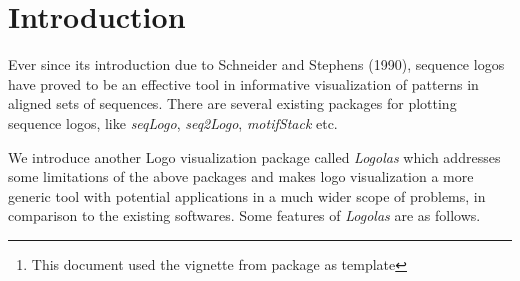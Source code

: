 \documentclass[12pt]{article}\usepackage[]{graphicx}\usepackage[usenames,dvipsnames]{color}
\author{Kushal K Dey, Dongyue Xie, Matthew Stephens  \\[1em]
\small{Dept. of Statistics, The University of Chicago} \mbox{ }\\
\small{\texttt{$^*$Correspondending Email: kkdey@uchicago.edu}}}
\newcommand{\Logolas}{\textit{Logolas}}
\begin{document}
\maketitle

\begin{abstract}
\vspace{1em}
Logo plots are popular in genomic studies for sequence alignment and motif detection. However, logo plots have been restrictive in its scope due to limited size of the library of symbols used by logo plotting tools and packages  and the lack of flexibility in extending it to other applications. In this package, we provide an easy and flexible interface for the user to plot logos. More importantly, we extend the library of logos from A, C, T, G (library of symbols in seqLogo) and English alphabets (library of symbols in RWebLogo, motifStack) to include numbers and alpha-numeric strings with provision for punctuations and arrows. It also provides the user with a simple graphical interface to create her own logo and add to her personal library.
In this vignette, we discuss a number of applications in genomics and beyond where such flexible logo plots can be effective in visualizing patterns.

\vspace{1em}
\textbf{\Logolas{} version:} 1.2.1 \footnote{This document used the vignette from \Bioconductor{} package  as  template}
\end{abstract}



\newpage

\tableofcontents

\section{Introduction}

Ever since its introduction due to Schneider and Stephens (1990), sequence logos have proved to be an effective tool in informative visualization of patterns in aligned sets of sequences. There are several existing packages for plotting sequence logos, like \textit{seqLogo}, \textit{seq2Logo}, \textit{motifStack} etc.

We introduce another Logo visualization package called \textit{Logolas} which addresses some limitations of the above packages and makes logo visualization a more generic tool with potential applications in a much wider scope of problems, in comparison to the existing softwares. Some features of \textit{Logolas} are as follows.
\end{document}
